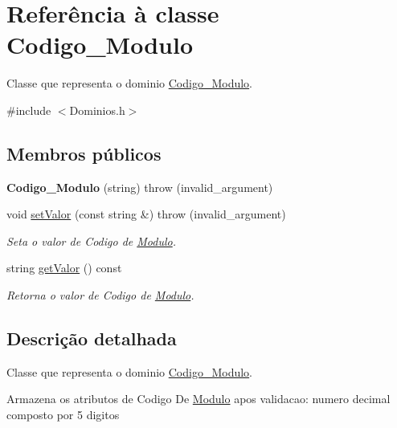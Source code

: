 \hypertarget{class_codigo___modulo}{
\section{\-Referência à classe \-Codigo\-\_\-\-Modulo}
\label{class_codigo___modulo}
}


\-Classe que representa o dominio \hyperlink{class_codigo___modulo}{\-Codigo\-\_\-\-Modulo}.  




{\ttfamily \#include $<$\-Dominios.\-h$>$}

\subsection*{\-Membros públicos}
\begin{DoxyCompactItemize}
\item 
\hypertarget{class_codigo___modulo_af02fd77a63061429f2951bc78741093e}{
{\bfseries \-Codigo\-\_\-\-Modulo} (string)  throw (invalid\-\_\-argument)}
\label{class_codigo___modulo_af02fd77a63061429f2951bc78741093e}

\item 
void \hyperlink{class_codigo___modulo_a974ed9c3733dcf75c362c53653e407e7}{set\-Valor} (const string \&)  throw (invalid\-\_\-argument)
\begin{DoxyCompactList}\small\item\em \-Seta o valor de \-Codigo de \hyperlink{class_modulo}{\-Modulo}. \end{DoxyCompactList}\item 
string \hyperlink{class_codigo___modulo_a87112e0fb26a7d32fe8cb06cc7d32746}{get\-Valor} () const 
\begin{DoxyCompactList}\small\item\em \-Retorna o valor de \-Codigo de \hyperlink{class_modulo}{\-Modulo}. \end{DoxyCompactList}\end{DoxyCompactItemize}


\subsection{\-Descrição detalhada}
\-Classe que representa o dominio \hyperlink{class_codigo___modulo}{\-Codigo\-\_\-\-Modulo}. 

\-Armazena os atributos de \-Codigo \-De \hyperlink{class_modulo}{\-Modulo} apos validacao\-: numero decimal composto por 5 digitos 

